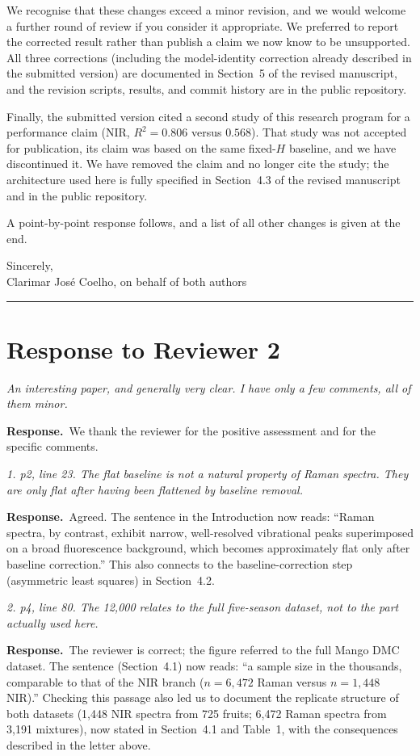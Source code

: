 \documentclass[11pt]{article}
\newenvironment{reviewer}{\par\color{black!70}\itshape}{\par}
\newcommand{\response}{\par\noindent\textbf{Response.}\ }
\begin{document}
We recognise that these changes exceed a minor revision, and we would welcome a further round of review if you consider it appropriate. We preferred to report the corrected result rather than publish a claim we now know to be unsupported. All three corrections (including the model-identity correction already described in the submitted version) are documented in Section~5 of the revised manuscript, and the revision scripts, results, and commit history are in the public repository.

Finally, the submitted version cited a second study of this research program for a performance claim (NIR, $R^{2}=0.806$ versus $0.568$). That study was not accepted for publication, its claim was based on the same fixed-$H$ baseline, and we have discontinued it. We have removed the claim and no longer cite the study; the architecture used here is fully specified in Section~4.3 of the revised manuscript and in the public repository.

A point-by-point response follows, and a list of all other changes is given at the end.

Sincerely,\\
Clarimar José Coelho, on behalf of both authors

\bigskip
\hrule
\bigskip

\section*{Response to Reviewer 2}

\begin{reviewer}
An interesting paper, and generally very clear. I have only a few comments, all of them minor.
\end{reviewer}
\response We thank the reviewer for the positive assessment and for the specific comments.

\begin{reviewer}
1. p2, line 23. The flat baseline is not a natural property of Raman spectra. They are only flat after having been flattened by baseline removal.
\end{reviewer}
\response Agreed. The sentence in the Introduction now reads: ``Raman spectra, by contrast, exhibit narrow, well-resolved vibrational peaks superimposed on a broad fluorescence background, which becomes approximately flat only after baseline correction.'' This also connects to the baseline-correction step (asymmetric least squares) in Section~4.2.

\begin{reviewer}
2. p4, line 80. The 12,000 relates to the full five-season dataset, not to the part actually used here.
\end{reviewer}
\response The reviewer is correct; the figure referred to the full Mango DMC dataset. The sentence (Section~4.1) now reads: ``a sample size in the thousands, comparable to that of the NIR branch ($n=6{,}472$ Raman versus $n=1{,}448$ NIR).'' Checking this passage also led us to document the replicate structure of both datasets (1,448 NIR spectra from 725 fruits; 6,472 Raman spectra from 3,191 mixtures), now stated in Section~4.1 and Table~1, with the consequences described in the letter above.
\end{document}
